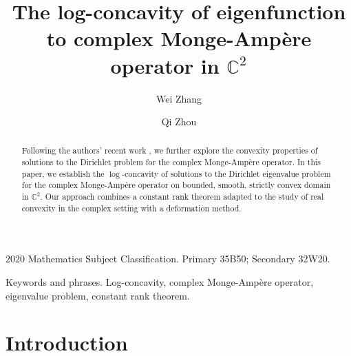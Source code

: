 \documentclass[11pt]{amsart}
\numberwithin{theorem}{section}
\numberwithin{equation}{section}
\begin{document}
\setlength{\baselineskip}{1.1\baselineskip}

\title[The log-concavity of eigenfunction to complex Monge-Amp\`{e}re operator]{The log-concavity of eigenfunction to complex Monge-Amp\`{e}re operator in $\mathbb{C}^2$}

\author{Wei Zhang}
\address{School of Mathematics and Statistics\\
Lanzhou University\\
Lanzhou, 730000, Gansu Province, China.}

\author{Qi Zhou}
\address{School of Mathematics and Statistics\\
Lanzhou University\\
Lanzhou, 730000, Gansu Province, China.}

\maketitle

\begin{abstract}
 Following the authors' recent work \cite{Zhang-Zhou2025}, we further explore the convexity properties of solutions to the Dirichlet problem for the complex Monge-Amp\`{e}re operator. In this paper, we establish the $\log$-concavity of solutions to the Dirichlet eigenvalue problem for the complex Monge-Amp\`{e}re operator on bounded, smooth, strictly convex domain in $\mathbb{C}^2$. Our approach combines a constant rank theorem adapted to the study of real convexity in the complex setting with a deformation method.
\end{abstract}

2020 Mathematics Subject Classification. Primary 35B50; Secondary 32W20.

Keywords and phrases. Log-concavity, complex Monge-Amp\`{e}re operator, eigenvalue problem, constant rank theorem.

\section{Introduction}
\end{document}
